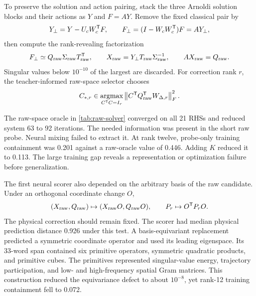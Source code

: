 To preserve the solution and action pairing, stack the three Arnoldi solution blocks and their actions as $Y$ and $F=AY$. Remove the fixed classical pair by
\begin{equation}
 Y_\perp=Y-U_cW_c^{\mathsf T} F,
 \qquad
 F_\perp=(I-W_cW_c^{\mathsf T})F=AY_\perp,
 \label{eq:raw-compensation}
\end{equation}
then compute the rank-revealing factorization
\begin{equation}
 F_\perp\simeq Q_{\rm raw}\Sigma_{\rm raw}T_{\rm raw}^{\mathsf T},
 \qquad
 X_{\rm raw}=Y_\perp T_{\rm raw}\Sigma_{\rm raw}^{-1},
 \qquad AX_{\rm raw}=Q_{\rm raw}.
 \label{eq:raw-pair}
\end{equation}
Singular values below $10^{-10}$ of the largest are discarded. For correction rank $r$, the teacher-informed raw-space selector chooses
\begin{equation}
 C_{*,r}\in\underset{C^{\mathsf T} C=I_r}{\operatorname{argmax}}
 \left\lVert C^{\mathsf T} Q_{\rm raw}^{\mathsf T} W_{\Delta,r}\right\rVert_F^2.
 \label{eq:raw-oracle}
\end{equation}



The raw-space oracle in \cref{tab:raw-solver} converged on all 21 RHSs and reduced system 63 to 92 iterations. The needed information was present in the short raw probe. Neural mixing failed to extract it. At rank twelve, probe-only training containment was 0.201 against a raw-oracle value of 0.446. Adding $K$ reduced it to 0.113. The large training gap reveals a representation or optimization failure before generalization.

The first neural scorer also depended on the arbitrary basis of the raw candidate. Under an orthogonal coordinate change $O$,
\begin{equation}
 (X_{\rm raw},Q_{\rm raw})\mapsto(X_{\rm raw}O,Q_{\rm raw}O),
 \qquad P_r\mapsto O^{\mathsf T} P_rO.
 \label{eq:coordinate-equivariance}
\end{equation}
The physical correction should remain fixed. The scorer had median physical prediction distance 0.926 under this test. A basis-equivariant replacement predicted a symmetric coordinate operator and used its leading eigenspace. Its 33-word span contained six primitive operators, symmetric quadratic products, and primitive cubes. The primitives represented singular-value energy, trajectory participation, and low- and high-frequency spatial Gram matrices. This construction reduced the equivariance defect to about $10^{-8}$, yet rank-12 training containment fell to 0.072.

